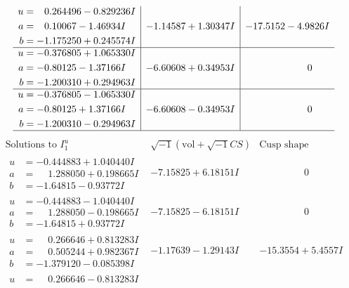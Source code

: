 \documentclass[1p]{elsarticle_modified}
\theoremstyle{definition}
\newcommand{\I}{\sqrt{-1}}
\begin{document}
$$\begin{array}{c|c|c}
\begin{aligned}
u &= \phantom{-}0.264496 - 0.829236 I \\
a &= \phantom{-}0.10067 - 1.46934 I \\
b &= -1.175250 + 0.245574 I\end{aligned}
 & -1.14587 + 1.30347 I & -17.5152 - 4.9826 I \\ \hline\begin{aligned}
u &= -0.376805 + 1.065330 I \\
a &= -0.80125 - 1.37166 I \\
b &= -1.200310 + 0.294963 I\end{aligned}
 & -6.60608 + 0.34953 I & \phantom{-0.000000 } 0 \\ \hline\begin{aligned}
u &= -0.376805 - 1.065330 I \\
a &= -0.80125 + 1.37166 I \\
b &= -1.200310 - 0.294963 I\end{aligned}
 & -6.60608 - 0.34953 I & \phantom{-0.000000 } 0\\
 \hline 
 \end{array}$$\newpage$$\begin{array}{c|c|c}  
\text{Solutions to }I^u_{1}& \I (\text{vol} + \sqrt{-1}CS) & \text{Cusp shape}\\
 \hline 
\begin{aligned}
u &= -0.444883 + 1.040440 I \\
a &= \phantom{-}1.288050 + 0.198665 I \\
b &= -1.64815 - 0.93772 I\end{aligned}
 & -7.15825 + 6.18151 I & \phantom{-0.000000 } 0 \\ \hline\begin{aligned}
u &= -0.444883 - 1.040440 I \\
a &= \phantom{-}1.288050 - 0.198665 I \\
b &= -1.64815 + 0.93772 I\end{aligned}
 & -7.15825 - 6.18151 I & \phantom{-0.000000 } 0 \\ \hline\begin{aligned}
u &= \phantom{-}0.266646 + 0.813283 I \\
a &= \phantom{-}0.505244 + 0.982367 I \\
b &= -1.379120 - 0.085398 I\end{aligned}
 & -1.17639 - 1.29143 I & -15.3554 + 5.4557 I \\ \hline\begin{aligned}
u &= \phantom{-}0.266646 - 0.813283 I \\

\end{aligned}
\end{array}$$
\end{document}
